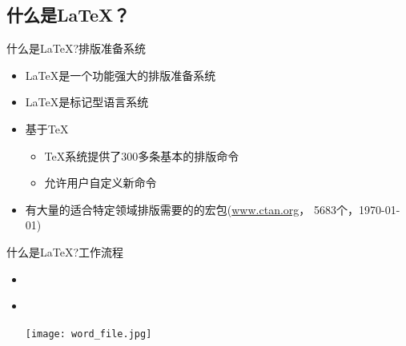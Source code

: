 \documentclass[xcolor=svgnames, t, aspectratio=169]{ctexbeamer}
\begin{document}
\subsection[是什么？]{什么是\LaTeX ？}\label{sec01-02}
\begin{frame}[t]{什么是\LaTeX?}{排版准备系统}
  \stretchon
  \begin{itemize}
  \item \LaTeX{}是一个功能强大的排版准备系统
  \item \LaTeX{}是标记型语言系统
  \item 基于\TeX
    \begin{itemize}
    \item \TeX{}系统提供了300多条基本的排版命令
    \item 允许用户自定义新命令
    \end{itemize}
  \item 有大量的适合特定领域排版需要的的宏包(\url{www.ctan.org}，
    \alert{5683}个，\today )
  \end{itemize}
  \stretchoff
\end{frame}

\begin{frame}[t]{什么是\LaTeX?}{工作流程}
  \begin{itemize}
  \item \wysiwym\\[4ex]
    \begin{center}
    \end{center}
    \vspace{4ex}
  \item \wysiwyg\\[4ex]
    \begin{center}
      \texttt{[image: word\_file.jpg]}
    \end{center}
  \end{itemize}
\end{frame}
\end{document}
